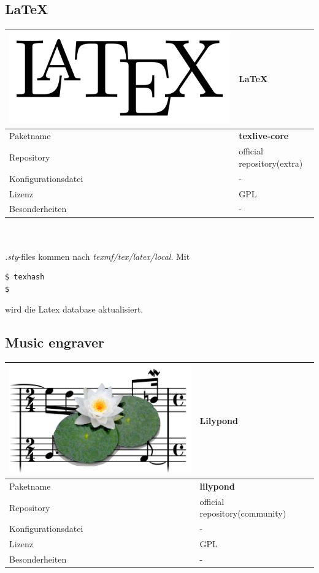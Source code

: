 \subsection{\LaTeX}
\begin{tabular}{l|l}
\includegraphics[scale=0.05]{latex-logo.pdf} & \LaTeX \\ \hline
Paketname & \textbf{texlive-core} \\ 
Repository & official repository(extra) \\
Konfigurationsdatei & - \\
Lizenz & GPL \\
Besonderheiten & - \\
\end{tabular}
\\ \\
\emph{.sty}-files kommen nach \emph{texmf/tex/latex/local}.
Mit 
\begin{lstlisting}[style=Bash, frame=none]
$ texhash
$
\end{lstlisting}
wird die Latex database aktualisiert.


\subsection{Music engraver}
\begin{tabular}{l|l}
\includegraphics[scale=0.2]{lilypond-logo.png} & Lilypond \\ \hline
Paketname & \textbf{lilypond} \\ 
Repository & official repository(community) \\
Konfigurationsdatei & - \\
Lizenz & GPL \\
Besonderheiten & - \\
\end{tabular}
\\ \\

